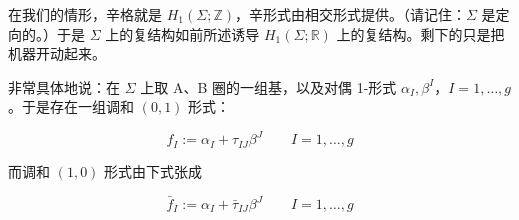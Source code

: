在我们的情形，辛格就是 $H_1(\Sigma;\mathbb{Z})$，辛形式由相交形式提供。（请记住：$\Sigma$ 是定向的。）于是 $\Sigma$ 上的复结构如前所述诱导 $H_1(\Sigma;\mathbb{R})$ 上的复结构。剩下的只是把机器开动起来。

非常具体地说：在 $\Sigma$ 上取 A、B 圈的一组基，以及对偶 1-形式 $\alpha_I,\beta^I$，$I=1,\dots,g$。于是存在一组调和 $(0,1)$ 形式：

\begin{equation}
  f_I:=\alpha_I+\tau_{IJ}\beta^J \qquad I=1,\dots,g
  \tag{2.179}
  \label{eq:2.179}
\end{equation}

而调和 $(1,0)$ 形式由下式张成

\begin{equation}
  \bar f_I:=\alpha_I+\bar\tau_{IJ}\beta^J \qquad I=1,\dots,g
  \tag{2.180}
  \label{eq:2.180}
\end{equation}
